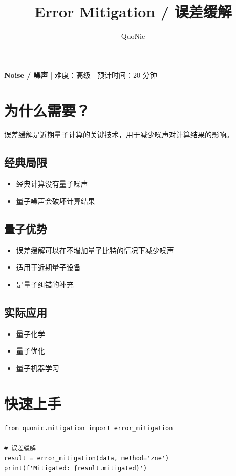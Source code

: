 \documentclass[12pt,a4paper]{article}
\title{Error Mitigation / 误差缓解}
\author{QuoNic}
\date{}
\begin{document}
\maketitle

\begin{center}
\textbf{Noise / 噪声} | 难度：高级 | 预计时间：20 分钟
\end{center}

\tableofcontents
\newpage

\section{为什么需要？}

误差缓解是近期量子计算的关键技术，用于减少噪声对计算结果的影响。

\subsection{经典局限}
\begin{itemize}
  \item 经典计算没有量子噪声
  \item 量子噪声会破坏计算结果
\end{itemize}

\subsection{量子优势}
\begin{itemize}
  \item 误差缓解可以在不增加量子比特的情况下减少噪声
  \item 适用于近期量子设备
  \item 是量子纠错的补充
\end{itemize}

\subsection{实际应用}
\begin{itemize}
  \item 量子化学
  \item 量子优化
  \item 量子机器学习
\end{itemize}

\section{快速上手}

\begin{verbatim}
from quonic.mitigation import error_mitigation

# 误差缓解
result = error_mitigation(data, method='zne')
print(f'Mitigated: {result.mitigated}')
\end{verbatim}
\end{document}
